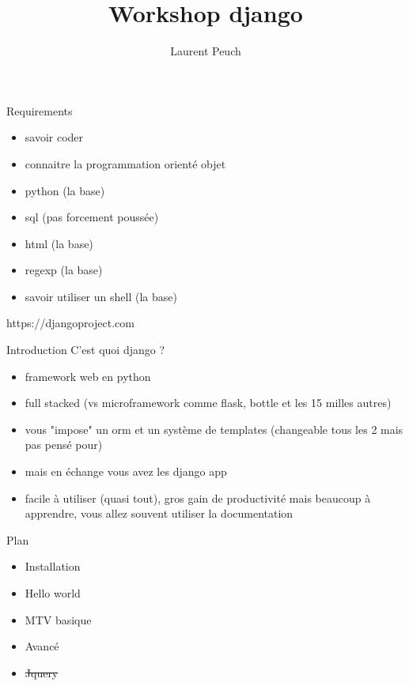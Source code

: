 \documentclass{beamer}
\begin{document}
\title{Workshop django}
\author{Laurent Peuch}

\maketitle{}

\begin{frame}{Requirements}
\begin{itemize}
    \item savoir coder
    \item connaitre la programmation orienté objet
    \item python (la base)
    \item sql (pas forcement poussée)
    \item html (la base)
    \item regexp (la base)
    \item savoir utiliser un shell (la base)
\end{itemize}
\end{frame}

\begin{frame}[fragile]{}
    \LARGE \begin{center}https://djangoproject.com\end{center}
\end{frame}

\begin{frame}{Introduction}
    \vspace{3mm}
    C'est quoi django ?
    \begin{itemize}
        \item framework web en python\pause
        \item full stacked (vs microframework comme flask, bottle et les 15 milles autres)\pause
        \item vous "impose" un orm et un système de templates (changeable tous les 2 mais pas pensé pour)\pause
        \item mais en échange vous avez les django app\pause
        \item facile à utiliser (quasi tout), gros gain de productivité mais beaucoup à apprendre, vous allez souvent utiliser la documentation
    \end{itemize}
\end{frame}

\begin{frame}{Plan}
    \begin{itemize}
        \item Installation
        \item Hello world
        \item MTV basique
        \item Avancé
        \item \sout{Jquery}
    \end{itemize}
\end{frame}
\end{document}
